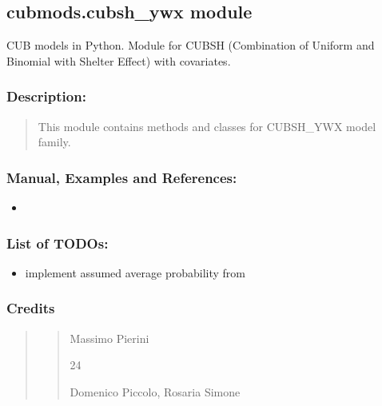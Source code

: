 \documentclass[letterpaper,10pt,english]{sphinxmanual}
\begin{document}
\subsection{cubmods.cubsh\_ywx module}
\label{\detokenize{cubmods:module-cubmods.cubsh_ywx}}\label{\detokenize{cubmods:cubmods-cubsh-ywx-module}}\label{\detokenize{cubmods:cubshywx-module}}
\sphinxAtStartPar
CUB models in Python.
Module for CUBSH (Combination of Uniform
and Binomial with Shelter Effect) with covariates.


\subsubsection{Description:}
\label{\detokenize{cubmods:id38}}\begin{quote}

\sphinxAtStartPar
This module contains methods and classes
for CUBSH\_YWX model family.
\end{quote}


\subsubsection{Manual, Examples and References:}
\label{\detokenize{cubmods:id39}}\begin{itemize}
\item {} 
\sphinxAtStartPar
{}

\end{itemize}


\subsubsection{List of TODOs:}
\label{\detokenize{cubmods:id40}}\begin{itemize}
\item {} 
\sphinxAtStartPar
implement assumed average probability from 

\end{itemize}


\subsubsection{Credits}
\label{\detokenize{cubmods:id41}}\begin{quote}
\begin{quote}\begin{description}
\sphinxAtStartPar
Massimo Pierini

\sphinxhyphen{}24

\sphinxAtStartPar
Domenico Piccolo, Rosaria Simone

\sphinxAtStartPar
{}

\end{description}\end{quote}
\end{quote}
\end{document}
